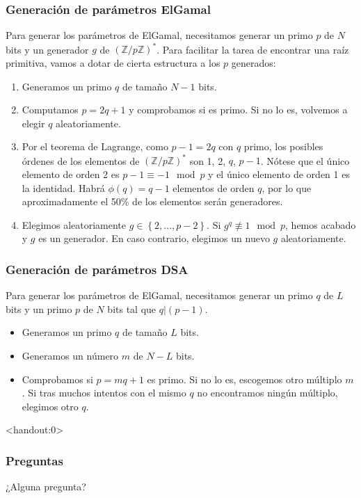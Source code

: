 \documentclass{beamer}
\begin{document}
\begin{frame}
    \frametitle{Generación de parámetros ElGamal}

    Para generar los parámetros de ElGamal, necesitamos generar un primo $p$ de $N$ bits y un generador $g$ de $\left( \mathbb{Z} / p \mathbb{Z} \right)^{*}$. Para facilitar la tarea de encontrar una raíz primitiva, vamos a dotar de cierta estructura a los $p$ generados:

    \begin{enumerate}
        \item Generamos un primo $q$ de tamaño $N-1$ bits.
        \item Computamos $p = 2q + 1$ y comprobamos si es primo. Si no lo es, volvemos a elegir $q$ aleatoriamente.
        \item Por el teorema de Lagrange, como $p-1 = 2 q$ con $q$ primo, los posibles órdenes de los elementos de $\left( \mathbb{Z} / p \mathbb{Z} \right)^{*}$ son 1, 2, $q$, $p-1$. Nótese que el único elemento de orden 2 es $p-1 \equiv -1 \mod p$ y el único elemento de orden 1 es la identidad. Habrá $\phi(q) = q - 1$ elementos de orden $q$, por lo que aproximadamente el 50\% de los elementos serán generadores.
        \item Elegimos aleatoriamente $g \in \left\{2, ..., p-2\right\}$. Si $g^q \not\equiv 1 \mod p$, hemos acabado y $g$ es un generador. En caso contrario, elegimos un nuevo $g$ aleatoriamente.
    \end{enumerate}

\end{frame}

\begin{frame}
    \frametitle{Generación de parámetros DSA}

    Para generar los parámetros de ElGamal, necesitamos generar un primo $q$ de $L$ bits y un primo $p$ de $N$ bits tal que $q \vert (p-1)$.
    \begin{itemize}
        \item Generamos un primo $q$ de tamaño $L$ bits.
        \item Generamos un número $m$ de $N-L$ bits.
        \item Comprobamos si $p = m q + 1$ es primo. Si no lo es, escogemos otro múltiplo $m$. Si tras muchos intentos con el mismo $q$ no encontramos ningún múltiplo, elegimos otro $q$.
    \end{itemize}

\end{frame}


\begin{frame}<handout:0>
    \frametitle{Preguntas}
    
    \centering
    \Huge ¿Alguna pregunta?

\end{frame}
\end{document}
